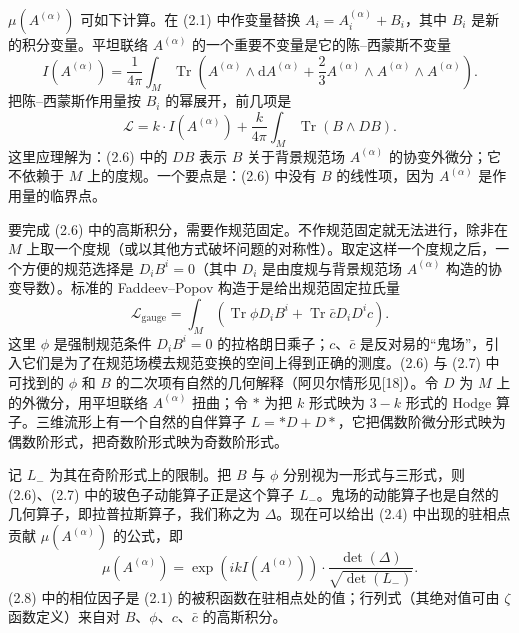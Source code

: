 \documentclass[11pt,a4paper]{article}
\begin{document}
$\mu(A^{(\alpha)})$ 可如下计算。在 (2.1) 中作变量替换 $A_i=A_i^{(\alpha)}+B_i$，其中 $B_i$ 是新的积分变量。平坦联络 $A^{(\alpha)}$ 的一个重要不变量是它的陈–西蒙斯不变量
\begin{equation}
    I(A^{(\alpha)})=\frac{1}{4\pi}\int_M\operatorname{Tr}\left(A^{(\alpha)}\wedge\mathrm{d}A^{(\alpha)}+\frac{2}{3}A^{(\alpha)}\wedge A^{(\alpha)}\wedge A^{(\alpha)}\right).
    \tag{2.5}
\end{equation}
把陈–西蒙斯作用量按 $B_i$ 的幂展开，前几项是
\begin{equation}
    \mathcal{L}=k\cdot I(A^{(\alpha)})+\frac{k}{4\pi}\int_M\operatorname{Tr}(B\wedge DB).
    \tag{2.6}
\end{equation}
这里应理解为：(2.6) 中的 $DB$ 表示 $B$ 关于背景规范场 $A^{(\alpha)}$ 的协变外微分；它不依赖于 $M$ 上的度规。一个要点是：(2.6) 中没有 $B$ 的线性项，因为 $A^{(\alpha)}$ 是作用量的临界点。

要完成 (2.6) 中的高斯积分，需要作规范固定。不作规范固定就无法进行，除非在 $M$ 上取一个度规（或以其他方式破坏问题的对称性）。取定这样一个度规之后，一个方便的规范选择是 $D_iB^i=0$（其中 $D_i$ 是由度规与背景规范场 $A^{(\alpha)}$ 构造的协变导数）。标准的 Faddeev--Popov 构造于是给出规范固定拉氏量
\begin{equation}
    \mathcal{L}_{\mathrm{gauge}}=\int_M\left(\operatorname{Tr}\phi D_iB^i+\operatorname{Tr}\bar{c}D_iD^ic\right).
    \tag{2.7}
\end{equation}
这里 $\phi$ 是强制规范条件 $D_iB^i=0$ 的拉格朗日乘子；$c$、$\bar{c}$ 是反对易的“鬼场”，引入它们是为了在规范场模去规范变换的空间上得到正确的测度。(2.6) 与 (2.7) 中可找到的 $\phi$ 和 $B$ 的二次项有自然的几何解释（阿贝尔情形见[18]）。令 $D$ 为 $M$ 上的外微分，用平坦联络 $A^{(\alpha)}$ 扭曲；令 $\ast$ 为把 $k$ 形式映为 $3-k$ 形式的 Hodge 算子。三维流形上有一个自然的自伴算子 $L=\ast D+D\ast$，它把偶数阶微分形式映为偶数阶形式，把奇数阶形式映为奇数阶形式。

记 $L_-$ 为其在奇阶形式上的限制。把 $B$ 与 $\phi$ 分别视为一形式与三形式，则 (2.6)、(2.7) 中的玻色子动能算子正是这个算子 $L_-$。鬼场的动能算子也是自然的几何算子，即拉普拉斯算子，我们称之为 $\Delta$。现在可以给出 (2.4) 中出现的驻相点贡献 $\mu(A^{(\alpha)})$ 的公式，即
\begin{equation}
    \mu(A^{(\alpha)})=\exp\left(ikI(A^{(\alpha)})\right)\cdot\frac{\det(\Delta)}{\sqrt{\det(L_-)}}.
    \tag{2.8}
\end{equation}
(2.8) 中的相位因子是 (2.1) 的被积函数在驻相点处的值；行列式（其绝对值可由 $\zeta$ 函数定义）来自对 $B$、$\phi$、$c$、$\bar{c}$ 的高斯积分。
\end{document}
